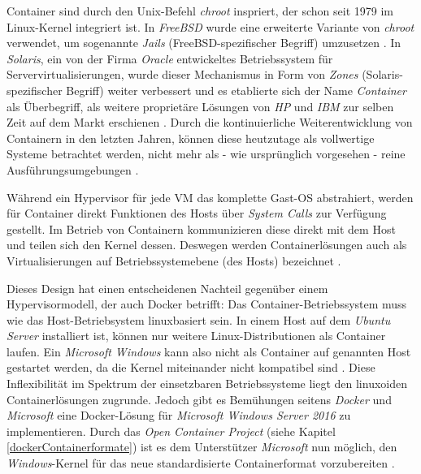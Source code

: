 \documentclass[../main.tex]{subfiles}
\begin{document}
      Container sind durch den Unix-Befehl \emph{chroot}\cite{chroot} inspriert, der schon seit 1979 im Linux-Kernel integriert ist. In \emph{FreeBSD} wurde eine erweiterte Variante von \emph{chroot} verwendet, um sogenannte \emph{Jails} (FreeBSD-spezifischer Begriff) umzusetzen \cite{jails}. In \emph{Solaris}, ein von der Firma \emph{Oracle} entwickeltes Betriebssystem für Servervirtualisierungen\cite{solaris}, wurde dieser Mechanismus in Form von \emph{Zones} (Solaris-spezifischer Begriff) \cite{zones} weiter verbessert und es etablierte sich der Name \emph{Container} als Überbegriff, als weitere proprietäre Lösungen von \emph{HP} und \emph{IBM} zur selben Zeit auf dem Markt erschienen \cite[S.2]{dockerLXCKub}. Durch die kontinuierliche Weiterentwicklung von Containern in den letzten Jahren, können diese heutzutage als vollwertige Systeme betrachtet werden, nicht mehr als - wie ursprünglich vorgesehen - reine Ausführungsumgebungen \cite[S.7]{dockerBook}.

      Während ein Hypervisor für jede \acrshort{VM} das komplette Gast-\acrshort{OS} abstrahiert, werden für Container direkt Funktionen des Hosts über \emph{System Calls} zur Verfügung gestellt. Im Betrieb von Containern kommunizieren diese direkt mit dem Host und teilen sich den Kernel dessen. Deswegen werden Containerlösungen auch als Virtualisierungen auf Betriebssystemebene (des Hosts) bezeichnet \cite[S.6+7]{dockerBook}\cite[S.2]{containerVirtPerformance}\cite[S.3]{dockerLXCKub}.

			Dieses Design hat einen entscheidenen Nachteil gegenüber einem Hypervisormodell, der auch Docker betrifft: Das Container-Betriebssystem muss wie das Host-Betriebsystem linuxbasiert sein. In einem Host auf dem \emph{Ubuntu Server} installiert ist, können nur weitere Linux-Distributionen als Container laufen. Ein \emph{Microsoft Windows} kann also nicht als Container auf genannten Host gestartet werden, da die Kernel miteinander nicht kompatibel sind \cite[S.6]{dockerBook}. Diese Inflexibilität im Spektrum der einsetzbaren Betriebssysteme liegt den linuxoiden Containerlösungen zugrunde. Jedoch gibt es Bemühungen seitens \emph{Docker} und \emph{Microsoft} eine Docker-Lösung für \emph{Microsoft Windows Server 2016} zu implementieren. Durch das \emph{Open Container Project} (siehe Kapitel \ref{dockerContainerformate}) ist es dem Unterstützer \emph{Microsoft} nun möglich, den \emph{Windows}-Kernel für das neue standardisierte Containerformat vorzubereiten \cite{dockerWindowsSupport}.
\end{document}
